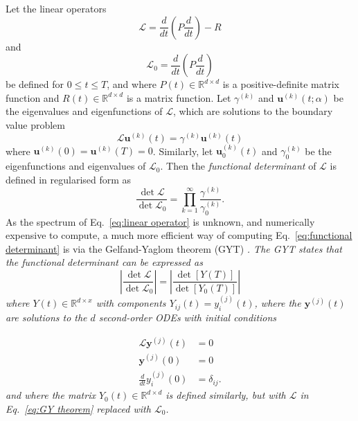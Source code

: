 Let the linear operators
\begin{equation}
\mathcal{L}=\frac{d}{dt}\left(P\frac{d}{dt}\right)-R\label{eq:linear operator}
\end{equation}
and
\begin{equation}
\mathcal{L}_{0}=\frac{d}{dt}\left(P\frac{d}{dt}\right)\label{eq:free linear operator}
\end{equation}
be defined for $0\leq t\leq T$, and where $P(t)\in\mathbb{R}^{d\times d}$
is a positive-definite matrix function and $R(t)\in\mathbb{R}^{d\times d}$
is a matrix function. Let $\gamma^{(k)}$ and $\mathbf{u}^{(k)}(t;\alpha)$
be the eigenvalues and eigenfunctions of $\mathcal{L}$, which are
solutions to the boundary value problem
\begin{equation}
\mathcal{L}\mathbf{u}^{(k)}(t)=\gamma^{(k)}\mathbf{u}^{(k)}(t)\label{eq:eigenfunction eq}
\end{equation}
where $\mathbf{u}^{(k)}(0)=\mathbf{u}^{(k)}(T)=0$. Similarly, let
$\mathbf{u}_{0}^{(k)}(t)$ and $\gamma_{0}^{(k)}$ be the eigenfunctions
and eigenvalues of $\mathcal{L}_{0}$. Then the \emph{functional determinant}
of $\mathcal{L}$ is defined in regularised form as
\begin{equation}
\frac{\det\mathcal{L}}{\det\mathcal{L}_{0}}=\prod_{k=1}^{\infty}\frac{\gamma^{(k)}}{\gamma_{0}^{(k)}}.\label{eq:functional determinant}
\end{equation}
As the spectrum of Eq.~\eqref{eq:linear operator} is unknown, and
numerically expensive to compute, a much more efficient way of computing
Eq.~\eqref{eq:functional determinant} is via the Gelfand-Yaglom
theorem (GYT) \textit{\emph{\citep{gelfandIntegrationFunctionalSpaces1960,levitTheoremInfiniteProducts1977,dunneFunctionalDeterminantsQuantum2008}.
The GYT states that the functional determinant can be expressed as
\begin{equation}
\left|\frac{\det\mathcal{L}}{\det\mathcal{L}_{0}}\right|=\left|\frac{\det\left[Y(T)\right]}{\det\left[Y_{0}(T)\right]}\right|\label{eq:GY result}
\end{equation}
where $Y(t)\in\mathbb{R}^{d\times x}$ with components $Y_{ij}(t)=y_{i}^{(j)}(t)$,
where the $\mathbf{y}^{(j)}(t)$ are solutions to the $d$ second-order
ODEs with initial conditions}}

\begin{align}
\mathcal{L}\mathbf{y}^{(j)}(t) & =0\label{eq:GY theorem}\\
\mathbf{y}^{(j)}(0) & =0\\
\frac{d}{dt}y_{i}^{(j)}(0) & =\delta_{ij}.
\end{align}
\textit{\emph{and where the matrix $Y_{0}(t)\in\mathbb{R}^{d\times d}$
is defined similarly, but with $\mathcal{L}$ in Eq.}}~\textit{\emph{\eqref{eq:GY theorem}
replaced with $\mathcal{L}_{0}$.}}

